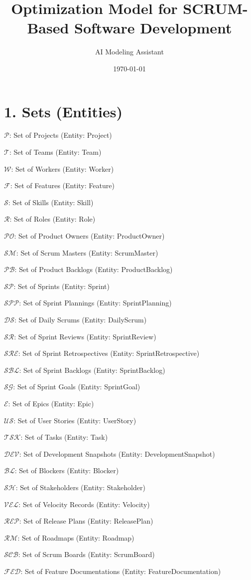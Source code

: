 \documentclass[12pt]{article}
\title{Optimization Model for SCRUM-Based Software Development}
\author{AI Modeling Assistant}
\date{\today}
\begin{document}
\maketitle
\tableofcontents
\newpage

\section{1. Sets (Entities)}
\item $ \mathcal{P} $: Set of Projects (Entity: Project)
    \item $ \mathcal{T} $: Set of Teams (Entity: Team)
    \item $ \mathcal{W} $: Set of Workers (Entity: Worker)
    \item $ \mathcal{F} $: Set of Features (Entity: Feature)
    \item $ \mathcal{S} $: Set of Skills (Entity: Skill)
    \item $ \mathcal{R} $: Set of Roles (Entity: Role)
    \item $ \mathcal{PO} $: Set of Product Owners (Entity: ProductOwner)
    \item $ \mathcal{SM} $: Set of Scrum Masters (Entity: ScrumMaster)
    \item $ \mathcal{PB} $: Set of Product Backlogs (Entity: ProductBacklog)
    \item $ \mathcal{SP} $: Set of Sprints (Entity: Sprint)
    \item $ \mathcal{SPP} $: Set of Sprint Plannings (Entity: SprintPlanning)
    \item $ \mathcal{DS} $: Set of Daily Scrums (Entity: DailyScrum)
    \item $ \mathcal{SR} $: Set of Sprint Reviews (Entity: SprintReview)
    \item $ \mathcal{SRE} $: Set of Sprint Retrospectives (Entity: SprintRetrospective)
    \item $ \mathcal{SBL} $: Set of Sprint Backlogs (Entity: SprintBacklog)
    \item $ \mathcal{SG} $: Set of Sprint Goals (Entity: SprintGoal)
    \item $ \mathcal{E} $: Set of Epics (Entity: Epic)
    \item $ \mathcal{US} $: Set of User Stories (Entity: UserStory)
    \item $ \mathcal{TSK} $: Set of Tasks (Entity: Task)
    \item $ \mathcal{DEV} $: Set of Development Snapshots (Entity: DevelopmentSnapshot)
    \item $ \mathcal{BL} $: Set of Blockers (Entity: Blocker)
    \item $ \mathcal{SH} $: Set of Stakeholders (Entity: Stakeholder)
    \item $ \mathcal{VEL} $: Set of Velocity Records (Entity: Velocity)
    \item $ \mathcal{REP} $: Set of Release Plans (Entity: ReleasePlan)
    \item $ \mathcal{RM} $: Set of Roadmaps (Entity: Roadmap)
    \item $ \mathcal{SCB} $: Set of Scrum Boards (Entity: ScrumBoard)
    \item $ \mathcal{FED} $: Set of Feature Documentations (Entity: FeatureDocumentation)
\end{document}
